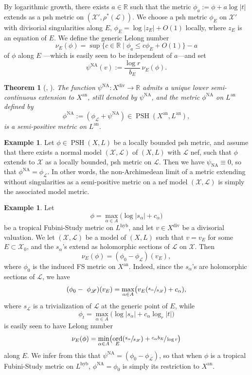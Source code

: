 \documentclass[JEP,XML,SOM,Unicode,published]{cedram}
\let\sep\mid
\newtheorem{theo}[equation]{Theorem}
\theoremstyle{definition}
\newtheorem{ex}[equation]{Example}
\newcommand \R{\mathbb R}
\newcommand \Ld {\mathscr {L}}
\newcommand \X {\mathscr{X}}
\newcommand{\an}{\mathrm{an}}
\newcommand{\hyb}{\mathrm{hyb}}
\DeclareMathOperator{\NA}{NA}
\DeclareMathOperator{\ord}{ord}
\DeclareMathOperator{\PSH}{PSH}
\DeclareMathOperator{\xdiv}{div}
\begin{document}
By logarithmic growth, there exists $a \in \R$ such that the metric $ \phi_a:=\phi + a \log \lvert t \rvert$ extends as a psh metric on $(\X', \rho^*(\Ld))$.
We choose a psh metric $\phi_E$ on $\X'$ with divisorial singularities along $E$, \ie $\phi_E = \log \lvert z_E \rvert +O(1)$ locally, where $z_E$ is an equation of $E$. We define the generic Lelong number
\[
\nu_E(\phi) = \sup \{ c \in \R \sep \phi_a \le c \phi_E + O(1) \}-a
\]
of $\phi$ along $E$ \cite{BFJ0}---which is easily seen to be independent of $a$---and set
\[
\psi^{\NA}(v):= \frac{\log r}{b_E}\, \nu_E(\phi).
\]
\begin{theo}[{\cite[Th.\,6.2]{BBJ}, \cite[Th.\,3.3.1]{Reb}}] \label{theo ext phina}
The function $\psi^{\NA}: X^{\xdiv} \to \R$ admits a unique lower semi-continuous extension to $X^{\an}$, still denoted by $\psi^{\NA}$, and the metric $\phi^{\NA}$ on $L^{\an}$ defined by
\[
\phi^{\NA}:= (\phi_{\Ld} + \psi^{\NA}) \in \PSH(X^{\an}, L^{\an}),
\]
is a semi-positive metric on $L^{\an}$.
\end{theo}
\begin{ex} \label{ex bdd model} Let $\phi \in \PSH(X,L)$ be a locally bounded psh metric, and assume that there exists a normal model $(\X, \Ld)$ of $(X, L)$ with $\Ld$ nef, such that $\phi$ extends to $\X$ as a locally bounded, psh metric on $\Ld$. Then we have $\psi_{\NA} \equiv 0$, so that $\phi^{\NA} = \phi_{\Ld}$. In other words, the non-Archimedean limit of a metric extending without singularities as a semi-positive metric on a nef model $(\X, \Ld)$ is simply the associated model metric.
\end{ex}
\begin{ex} \label{ex Lelong TFS}
Let
\[
\phi = \max_{\alpha \in A} \bigl(\log \lvert s_{\alpha} \rvert + c_{\alpha} \bigr)
\]
be a tropical Fubini-Study metric on $L^{\hyb}$, and let $v \in X^{\xdiv}$ be a divisorial valuation. We let $(\X, \Ld)$ be a model of $(X,L)$ such that $v = v_E$ for some $E \subset \X_0$, and the $s_{\alpha}$'s extend as holomorphic sections of $\Ld$ on $\X$. Then
\[
\nu_E(\phi) =(\phi_0- \phi_{\Ld})(v_E),
\]
where $\phi_0$ is the induced FS metric on $X^{\an}$. Indeed, since the $s_{\alpha}$'s are holomorphic sections of $\Ld$, we have
\[
(\phi_0- \phi_{\Ld})(v_E) = \max_{\alpha \in A} \bigl(v_E(\sfrac{s_{\alpha}}{s_{\Ld}}) +c_{\alpha}),
\]
where $s_{\Ld}$ is a trivialization of $\Ld$ at the generic point of $E$, while
\[
\phi_t = \max_{\alpha \in A} \bigl(\log \lvert s_{\alpha} \rvert + c_{\alpha} \log_r \lvert t \rvert \bigr)
\]
is easily seen to have Lelong number
\[
\nu_E(\phi) = \min_{\alpha \in A} \bigl(\ord_E(\sfrac{s_{\alpha}}{s_{\Ld}}) +\sfrac{c_{\alpha}b_E}{\log r} \bigr)
\]
along $E$. We infer from this that $\psi^{\NA} = (\phi_0 - \phi_{\Ld})$, so that when $\phi$ is a tropical Fubini-Study metric on $L^{\hyb}$, $\phi^{\NA} = \phi_0$ is simply its restriction to $X^{\an}$.
\end{ex}
\end{document}
